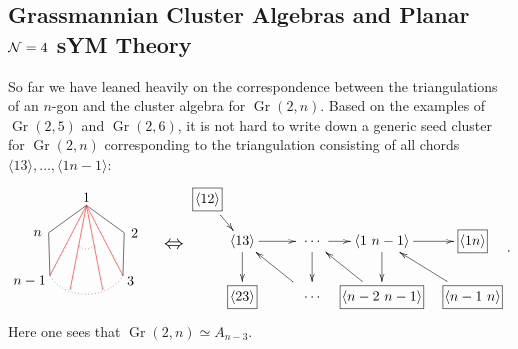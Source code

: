 \documentclass[12pt]{article}
\DeclareMathOperator{\Gr}{Gr}
\def\ket#1{\langle #1 \rangle}
\begin{document}
\subsection{Grassmannian Cluster Algebras and Planar ${\cal N} = 4$ sYM Theory}

So far we have leaned heavily on the correspondence between the triangulations of an $n$-gon and the cluster algebra for $\Gr(2,n)$. Based on the examples of $\Gr(2,5)$ and $\Gr(2,6)$, it is not hard to write down a generic seed cluster for $\Gr(2,n)$ corresponding to the triangulation consisting of all chords $\ket{13},\ldots,\ket{1n{-}1}$:
\begin{equation}\label{eq:g2n-seed}
\begin{gathered}
\begin{tikzpicture}
	\coordinate (P1) at (90:1);
	\coordinate (P2) at (18:1);
	\coordinate (P3) at (320:1.2);
	\coordinate (P4) at (220:1.2);
	\coordinate (P5) at (162:1);
	\draw (0,1.2) node {1};
	\draw (1,.3) node[anchor=west] {2};
	\draw (.9,-.9) node[anchor=west] {3};
	\draw (-.9,-.9) node[anchor=east] {$n-1$};
	\draw (-1,.3) node[anchor=east] {$n$};
	\draw (P1) -- (P2) -- (P3);
	\draw[dotted] (P3) to[out=240,in=300] (P4);
	\draw (P4) -- (P5) -- (P1);
	\draw[red] (P1) -- (P3);
	\draw[red] (P1) -- (P4);
	\draw[red] (P1) -- (290:1.2);
	\draw[red] (P1) -- (250:1.2);
	\draw[dotted] (.2,0) to[out=240,in=300] (-.2,0);
	\draw (2.2,0) node {\scalebox{1.4}{$\Leftrightarrow$}};
\end{tikzpicture}  
\begin{xy} 0;<1pt,0pt>:<0pt,1pt>::
	(25,40) *+{\langle 13\rangle} ="0",
	(75,40) *+{\color{white} \langle 14\rangle} ="1",
	(125,40) *+{\langle 1\ n-1 \rangle} ="2",
	(0,70) *+{\framebox[5ex]{$\langle 12\rangle$}} ="3",
	(25,0) *+{\framebox[5ex]{$\langle 23\rangle$}} ="4",
	(75,0) *+{\color{white} \framebox[5ex]{$\langle 34\rangle$}} ="5",
	(125,0) *+{\framebox[14ex]{$\langle n-2 \ n-1\rangle$}} ="6",
	(190,0) *+{\framebox[10ex]{$\langle n-1 \ n\rangle$}} ="7",
	(190,40) *+{\framebox[5ex]{$\langle 1n \rangle$}} ="8",
	(75,40) *+{\dots} ="01",
	(75,0) *+{\dots} ="05",
	"0", {\ar"1"},
	"1", {\ar"2"},
	"3", {\ar"0"},
	"0", {\ar"4"},
	"5", {\ar"0"},
	"1", {\ar"5"},
	"6", {\ar"1"},
	"2", {\ar"6"},
	"7", {\ar"2"},
	"2", {\ar"8"},
\end{xy}
\end{gathered}.
\end{equation}
Here one sees that $\Gr(2,n) \simeq A_{n-3}$. 
\end{document}
